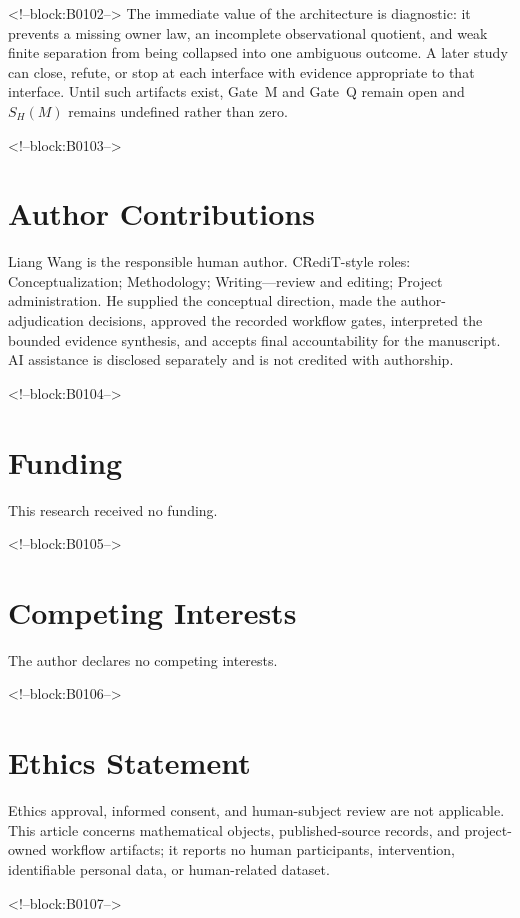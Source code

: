 \documentclass[11pt,a4paper]{article}
\begin{document}
<!--block:B0102-->
The immediate value of the architecture is diagnostic: it prevents a missing owner law, an incomplete observational quotient, and weak finite separation from being collapsed into one ambiguous outcome. A later study can close, refute, or stop at each interface with evidence appropriate to that interface. Until such artifacts exist, Gate~M and Gate~Q remain open and \(S_H(M)\) remains undefined rather than zero.

<!--block:B0103-->
\section*{Author Contributions}
Liang Wang is the responsible human author. CRediT-style roles: Conceptualization; Methodology; Writing---review and editing; Project administration. He supplied the conceptual direction, made the author-adjudication decisions, approved the recorded workflow gates, interpreted the bounded evidence synthesis, and accepts final accountability for the manuscript. AI assistance is disclosed separately and is not credited with authorship.

<!--block:B0104-->
\section*{Funding}
This research received no funding.

<!--block:B0105-->
\section*{Competing Interests}
The author declares no competing interests.

<!--block:B0106-->
\section*{Ethics Statement}
Ethics approval, informed consent, and human-subject review are not applicable. This article concerns mathematical objects, published-source records, and project-owned workflow artifacts; it reports no human participants, intervention, identifiable personal data, or human-related dataset.

<!--block:B0107-->
\end{document}
